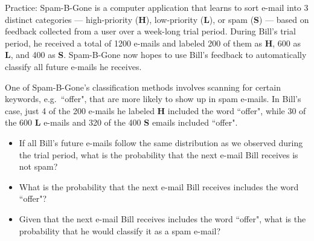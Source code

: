 \documentclass[11pt,letterpaper,twoside]{article}
\begin{document}
Practice: Spam-B-Gone is a computer application that learns to sort e-mail into 3 distinct categories --- high-priority ({\bf H}), low-priority ({\bf L}), or spam ({\bf S}) --- based on feedback collected from a user over a week-long trial period. During Bill's trial period, he received a total of 1200 e-mails and labeled 200 of them as {\bf H}, 600 as {\bf L}, and 400 as {\bf S}.  Spam-B-Gone now hopes to use Bill's feedback to automatically classify all future e-mails he receives.

One of Spam-B-Gone's classification methods involves scanning for certain keywords, e.g.\ ``offer", that are more likely to show up in spam e-mails. In Bill's case, just 4 of the 200 e-mails he labeled {\bf H} included the word ``offer", while 30 of the 600 {\bf L} e-mails and 320 of the 400 {\bf S} emails included ``offer".

\begin{itemize}

\item If all Bill's future e-mails follow the same distribution as we observed during the trial period, what is the probability that the next e-mail Bill receives is not spam? \vspace{40pt}

\item What is the probability that the next e-mail Bill receives includes the word ``offer"? \vspace{40pt}

\item Given that the next e-mail Bill receives includes the word ``offer", what is the probability that he would classify it as a spam e-mail?

\end{itemize}

\label{totalpag}
\end{document}
